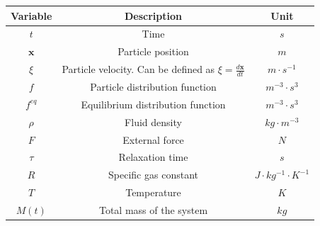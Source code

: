 \documentclass{article}
\begin{document}
\begin{table}[h]
\centering
\caption{Variables appearing in the governing equations}
\label{tbl-var-clean}
\begin{longtable}{|c|c|c|}
\hline
\textbf{Variable} & \textbf{Description} & \textbf{Unit} \\
\hline
\hline
$t$ & Time & $s$ \\
$\mathbf{x}$ & Particle position & $m$ \\
$\xi$ & Particle velocity. Can be defined as $\xi = \frac{d\mathbf{x}}{dt}$ & $m \cdot s^{-1}$ \\
$f$ & Particle distribution function & $m^{-3} \cdot s^{3}$ \\
$f^{eq}$ & Equilibrium distribution function & $m^{-3} \cdot s^{3}$ \\
$\rho$ & Fluid density & $kg \cdot m^{-3}$ \\
$F$ & External force & $N$ \\
$\tau$ & Relaxation time & $s$ \\
$R$ & Specific gas constant & $J \cdot kg^{-1} \cdot K^{-1}$ \\
$T$ & Temperature & $K$ \\
$M(t)$ & Total mass of the system & $kg$ \\
\hline
\end{longtable}
\end{table}



\pagebreak



\end{document}
